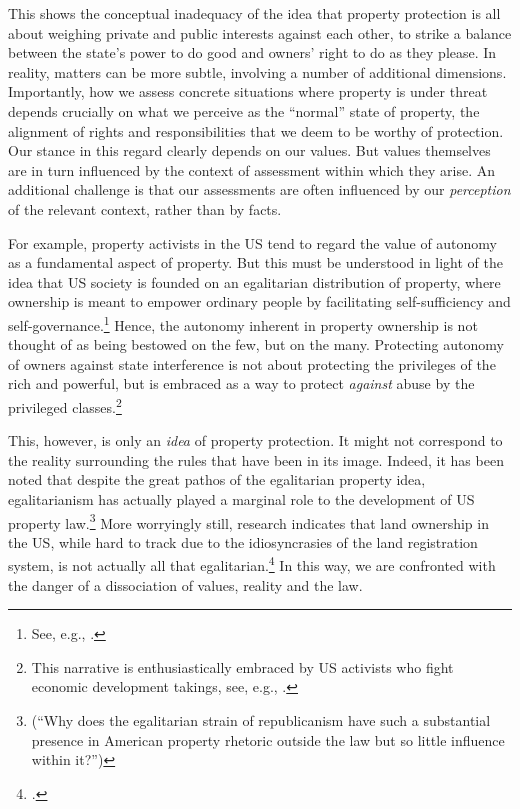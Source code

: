 This shows the conceptual inadequacy of the idea that property protection is all about weighing private and public interests against each other, to strike a balance between the state's power to do good and owners' right to do as they please. In reality, matters can be more subtle, involving a number of additional dimensions. Importantly, how we assess concrete situations where property is under threat depends crucially on what we perceive as the ``normal'' state of property, the alignment of rights and responsibilities that we deem to be worthy of protection. Our stance in this regard clearly depends on our values. But values themselves are in turn influenced by the context of assessment within which they arise. An additional challenge is that our assessments are often influenced by our \emph{perception} of the relevant context, rather than by facts.

For example, property activists in the US tend to regard the value of autonomy as a fundamental aspect of property. But this must be understood in light of the idea that US society is founded on an egalitarian distribution of property, where ownership is meant to empower ordinary people by facilitating self-sufficiency and self-governance.\footnote{See, e.g., \cite[173]{ely07}.} Hence, the autonomy inherent in property ownership is not thought of as being bestowed on the few, but on the many. Protecting autonomy of owners against state interference is not about protecting the privileges of the rich and powerful, but is embraced as a way to protect {\it against} abuse by the privileged classes.\footnote{This narrative is enthusiastically embraced by US activists who fight economic development takings, see, e.g., \cite{castle15}.} 

This, however, is only an {\it idea} of property protection. It might not correspond to the reality surrounding the rules that have been  in its image. Indeed, it has been noted that despite the great pathos of the egalitarian property idea, egalitarianism has actually played a marginal role to the development of US property law.\footnote{\cite[361]{williams98} (``Why does the egalitarian strain of republicanism have such a substantial presence in American property rhetoric outside the law but so little influence within it?'')} More worryingly still, research indicates that land ownership in the US, while hard to track due to the idiosyncrasies of the land registration system, is not actually all that egalitarian.\footcite[246-247]{jacobs98} In this way, we are confronted with the danger of a dissociation of values, reality and the law.

